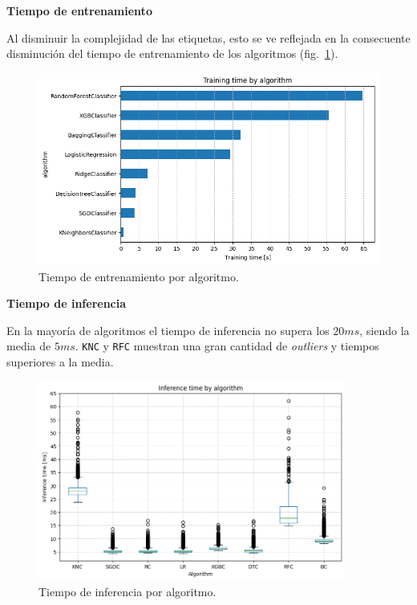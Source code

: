 \documentclass[a4paper,12pt]{article}
\begin{document}
		\textbf{Tiempo de entrenamiento}
				
		Al disminuir la complejidad de las etiquetas, esto se ve reflejada en la consecuente disminución del tiempo de entrenamiento de los algoritmos (fig.~\ref{fig:training_time_uet}).
				
		\begin{figure}[H]
			\begin{center}
				\includegraphics[width=1\textwidth]{training_time_uet.png}
				\caption{Tiempo de entrenamiento por algoritmo.}
				\label{fig:training_time_uet}
			\end{center}
		\end{figure}
				
		\textbf{Tiempo de inferencia}
				
		En la mayoría de algoritmos el tiempo de inferencia no supera los $20ms$, siendo la media de $5ms$. \texttt{KNC} y \texttt{RFC} muestran una gran cantidad de \textit{outliers} y tiempos superiores a la media.
				
		\begin{figure}[H]
			\begin{center}
				\includegraphics[width=0.9\textwidth]{inference_time_uet.png}
				\caption{Tiempo de inferencia por algoritmo.}
				\label{fig:inference_time_uet}
			\end{center}
		\end{figure}
				
\end{document}
